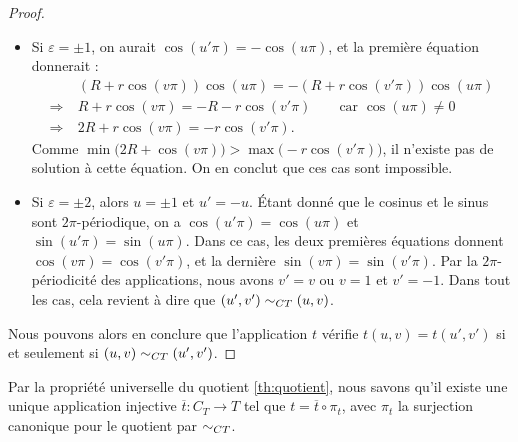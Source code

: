 \documentclass[hidelinks, 10pt]{article}
\begin{document}
\begin{proof}
\begin{itemize}
\begin{itemize}
    \item Si $\varepsilon=\pm1$, on aurait $\cos(u'\pi)=-\cos(u\pi)$, et la première équation donnerait : \[\begin{split}
        &(R+r\cos(v\pi))\cos(u\pi)=-(R+r\cos(v'\pi))\cos(u\pi)\\
        \Longrightarrow\ &R+r\cos(v\pi)=-R-r\cos(v'\pi)\qquad \text{car }\cos(u\pi)\neq0\\
        \Longrightarrow\ &2R+r\cos(v\pi)=-r\cos(v'\pi).
    \end{split}\]Comme $\min\big(2R+\cos(v\pi)\big)>\max\big(-r\cos(v'\pi)\big)$, il n'existe pas de solution à cette équation. On en conclut que ces cas sont impossible.
    \item Si $\varepsilon=\pm2$, alors $u=\pm1$ et $u'=-u$. Étant donné que le cosinus et le sinus sont $2\pi$-périodique, on a $\cos(u'\pi)=\cos(u\pi)$ et $\sin(u'\pi)=\sin(u\pi)$. Dans ce cas, les deux premières équations donnent $\cos(v\pi)=\cos(v'\pi)$, et la dernière $\sin(v\pi)=\sin(v'\pi)$. Par la $2\pi$-périodicité des applications, nous avons $v'=v$ ou $v=1$ et $v'=-1$. Dans tout les cas, cela revient à dire que $(u',v')\sim_{CT}(u,v)$.
\end{itemize}
\end{itemize}Nous pouvons alors en conclure que l'application $t$ vérifie $t(u,v)=t(u',v')$ si et seulement si $(u,v)\sim_{CT}(u',v')$.
\end{proof}

Par la propriété universelle du quotient \ref{th:quotient}, nous savons qu'il existe une unique application injective $\overline{t}:C_T\to T$ tel que $t=\overline{t}\circ\pi_t$, avec $\pi_t$ la surjection canonique pour le quotient par $\sim_{CT}$.
\end{document}
